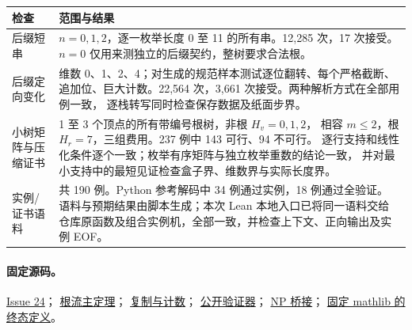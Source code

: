 \documentclass[UTF8,11pt]{ctexart}
\begin{document}
\begin{center}\small
\begin{tabularx}{\linewidth}{@{}lX@{}}
\toprule 检查 & 范围与结果\\\midrule
后缀短串 & $n=0,1,2$，逐一枚举长度 0 至 11 的所有串。12,285 次，17 次接受。
$n=0$ 仅用来测独立的后缀契约，整树要求合法根。\\
后缀定向变化 & 维数 0、1、2、4；对生成的规范样本测试逐位翻转、每个严格截断、
追加位、巨大计数。22,564 次，3,661 次接受。两种解析方式在全部用例一致，
逐栈转写同时检查保存数据及纸面步界。\\
小树矩阵与压缩证书 & 1 至 3 个顶点的所有带编号根树，非根 $H_v=0,1,2$，
相容 $m\le2$，根 $H_r=7$，三组费用。237 例中 143 可行、94 不可行。
逐行支持和线性化条件逐个一致；枚举有序矩阵与独立枚举重数的结论一致，
并对最小支持中的最短见证检查盒子界、维数界与实际长度界。\\
实例/证书语料 & 共 190 例。Python 参考解码中 34 例通过实例，18 例通过全验证。
语料与预期结果由脚本生成；本次 Lean 本地入口已将同一语料交给仓库原函数及组合实例机，全部一致，并检查上下文、正向输出及实例 EOF。\\\bottomrule
\end{tabularx}
\end{center}
\paragraph{固定源码。}
\href{https://github.com/huam54925-cpu/uav-routing-certification/issues/24}{Issue 24}；
\href{https://github.com/huam54925-cpu/uav-routing-certification/blob/38e13d45687c65265c9b327830f010f46443d0fc/LeanCompletion/UAV/TreeBudgetRootFlowTotal.lean}{根流主定理}；
\href{https://github.com/huam54925-cpu/uav-routing-certification/blob/38e13d45687c65265c9b327830f010f46443d0fc/LeanCompletion/UAV/TreeBudgetStackRoutine.lean}{复制与计数}；
\href{https://github.com/huam54925-cpu/uav-routing-certification/blob/38e13d45687c65265c9b327830f010f46443d0fc/LeanCompletion/UAV/TreeBudgetSparseVerifier.lean}{公开验证器}；
\href{https://github.com/huam54925-cpu/uav-routing-certification/blob/38e13d45687c65265c9b327830f010f46443d0fc/LeanCompletion/UAV/TreeBudgetSparseNPBridge.lean}{NP 桥接}；
\href{https://github.com/leanprover-community/mathlib4/blob/5450b53e5ddc75d46418fabb605edbf36bd0beb6/Mathlib/Computability/TuringMachine/Computable.lean}{固定 mathlib 的终态定义}。
\end{document}
